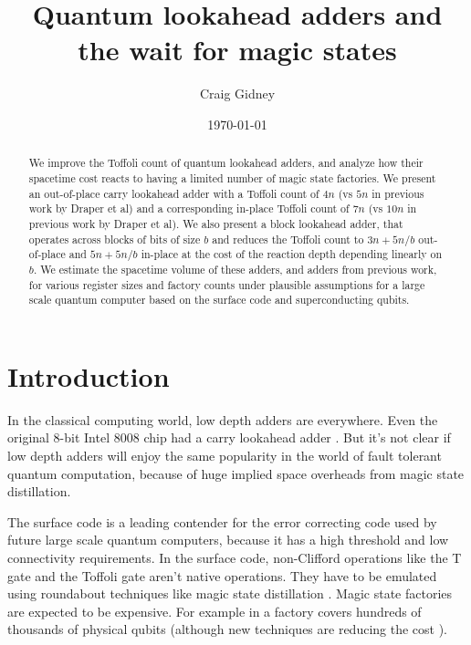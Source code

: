 \documentclass[onecolumn,unpublished]{quantumarticle}
\title{Quantum lookahead adders and the wait for magic states}
\date{\today}
\author{Craig Gidney}
\affiliation{Google Inc., Santa Barbara, California 93117, USA}
\theoremstyle{definition}
\theoremstyle{definition}
\theoremstyle{definition}
\begin{document}
\maketitle

\begin{abstract}
We improve the Toffoli count of quantum lookahead adders, and analyze how their spacetime cost reacts to having a limited number of magic state factories.
We present an out-of-place carry lookahead adder with a Toffoli count of $4n$ (vs $5n$ in previous work by Draper et al) and a corresponding in-place Toffoli count of $7n$ (vs $10n$ in previous work by Draper et al).
We also present a block lookahead adder, that operates across blocks of bits of size $b$ and reduces the Toffoli count to $3n + 5n/b$ out-of-place and $5n + 5n/b$ in-place at the cost of the reaction depth depending linearly on $b$.
We estimate the spacetime volume of these adders, and adders from previous work, for various register sizes and factory counts under plausible assumptions for a large scale quantum computer based on the surface code and superconducting qubits.
\end{abstract}

\section{Introduction}

In the classical computing world, low depth adders are everywhere.
Even the original 8-bit Intel 8008 chip had a carry lookahead adder \cite{shirriff2020reverseengineer8008}.
But it's not clear if low depth adders will enjoy the same popularity in the world of fault tolerant quantum computation, because of huge implied space overheads from magic state distillation.

The surface code \cite{fowler2012surfacereview} is a leading contender for the error correcting code used by future large scale quantum computers, because it has a high threshold and low connectivity requirements.
In the surface code, non-Clifford operations like the T gate and the Toffoli gate aren't native operations.
They have to be emulated using roundabout techniques like magic state distillation \cite{bravyi2005magicstate}.
Magic state factories are expected to be expensive.
For example in \cite{gidney2019catalyzed} a factory covers hundreds of thousands of physical qubits (although new techniques are reducing the cost \cite{litinski2019magicnotcostly}).
\end{document}
